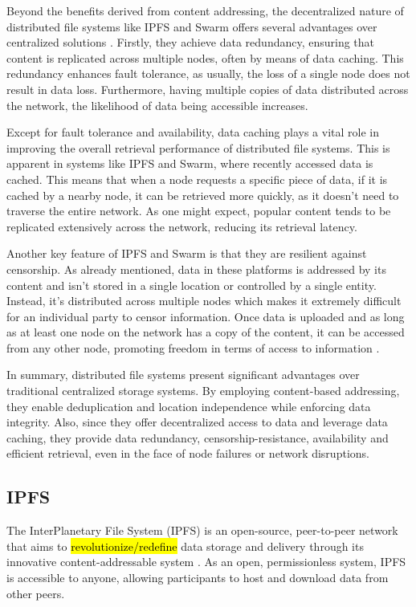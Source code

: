 Beyond the benefits derived from content addressing, the decentralized nature of distributed file systems like IPFS and Swarm offers several advantages over centralized solutions \citep{daniel_2022, ipfs_docs_1}. Firstly, they achieve data redundancy, ensuring that content is replicated across multiple nodes, often by means of data caching. This redundancy enhances fault tolerance, as usually, the loss of a single node does not result in data loss. Furthermore, having multiple copies of data distributed across the network, the likelihood of data being accessible increases.

Except for fault tolerance and availability, data caching plays a vital role in improving the overall retrieval performance of distributed file systems. This is apparent in systems like IPFS and Swarm, where recently accessed data is cached. This means that when a node requests a specific piece of data, if it is cached by a nearby node, it can be retrieved more quickly, as it doesn't need to traverse the entire network. As one might expect, popular content tends to be replicated extensively across the network, reducing its retrieval latency.

Another key feature of IPFS and Swarm is that they are resilient against censorship. As already mentioned, data in these platforms is addressed by its content and isn't stored in a single location or controlled by a single entity. Instead, it's distributed across multiple nodes which makes it extremely difficult for an individual party to censor information. Once data is uploaded and as long as at least one node on the network has a copy of the content, it can be accessed from any other node, promoting freedom in terms of access to information \citep{IPFS_team_2017}.

In summary, distributed file systems present significant advantages over traditional centralized storage systems. By employing content-based addressing, they enable deduplication and location independence while enforcing data integrity. Also, since they offer decentralized access to data and leverage data caching, they provide data redundancy, censorship-resistance, availability and efficient retrieval, even in the face of node failures or network disruptions.

\subsection{IPFS}\label{sec:ipfs}
The InterPlanetary File System (IPFS) is an open-source, peer-to-peer network that aims to \hl{revolutionize/redefine} data storage and delivery through its innovative content-addressable system \citep{benet_2014}. As an open, permissionless system, IPFS is accessible to anyone, allowing participants to host and download data from other peers. 

